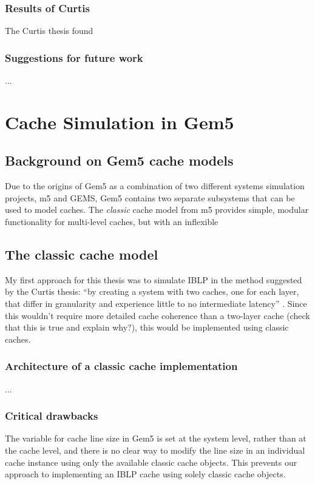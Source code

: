 \documentclass[12pt,twoside]{reedthesis}
\begin{document}
	\subsection*{Results of Curtis}
	The Curtis thesis found 

	\subsection*{Suggestions for future work}
	...

\chapter{Cache Simulation in Gem5}

\section{Background on Gem5 cache models}

	Due to the origins of Gem5 as a combination of two different systems simulation projects, m5 and GEMS, Gem5 contains two separate subsystems that can be used to model caches. The \textit{classic} cache model from m5 provides simple, modular functionality for multi-level caches, but with an inflexible 

\section{The classic cache model}

	My first approach for this thesis was to simulate IBLP in the method suggested by the Curtis thesis: ``by creating a system with two caches, one for each layer, that differ in granularity and experience little to no intermediate latency'' \cite{curtis}. Since this wouldn't require more detailed cache coherence than a two-layer cache (check that this is true and explain why?), this would be implemented using classic caches.

	\subsection*{Architecture of a classic cache implementation}
	...

	\subsection*{Critical drawbacks}
	The variable for cache line size in Gem5 is set at the system level, rather than at the cache level, and there is no clear way to modify the line size in an individual cache instance using only the available classic cache objects. This prevents our approach to implementing an IBLP cache using solely classic cache objects.
\end{document}
